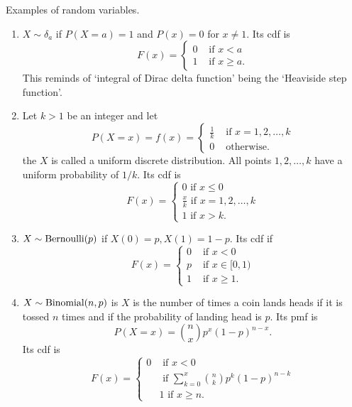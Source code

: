 \documentclass{article}
\begin{document}
Examples of random variables.
\begin{enumerate}
\item $X \sim \delta_a$ if $P(X=a) = 1$ and $P(x) = 0$ for $x \ne 1$. Its cdf is
\begin{equation}\label{c2e1}
F(x) = \begin{cases}
0 & \text{ if } x < a \\
1 & \text{ if } x \ge a.
\end{cases}
\end{equation}
This  reminds of `integral of Dirac delta function' being the `Heaviside step
function'.

\item Let $k > 1$ be an integer and let 
\begin{equation}\label{c2e2}
P(X=x) = f(x) = \begin{cases}
\frac{1}{k} & \text{ if } x = 1, 2, \ldots, k \\
0 & \text{ otherwise.}
\end{cases}
\end{equation}
the $X$ is called a uniform discrete distribution. All points $1, 2, \ldots, k$
have a uniform probability of $1/k$. Its cdf is
\begin{equation}\label{c2e3}
F(x) = \begin{cases}
0 \text{ if } x \le 0 \\
\frac{x}{k} \text{ if } x = 1, 2, \ldots, k \\
1 \text{ if } x > k.
\end{cases}
\end{equation}

\item $X \sim \text{Bernoulli}(p)$ if $X(0) = p, X(1) = 1 - p$. Its cdf if
\begin{equation}\label{c2e4}
F(x) = \begin{cases}
0 & \text{ if } x < 0 \\
p & \text{ if } x \in [0, 1) \\
1 & \text{ if } x \ge 1.
\end{cases}
\end{equation}

\item $X \sim \text{Binomial}(n, p)$ is $X$ is the number of times a coin lands heads if
it is tossed $n$ times and if the probability of landing head is $p$. Its pmf
is 
\begin{equation}\label{c2e5}
P(X=x) = \binom{n}{x}p^x(1 - p)^{n-x}.
\end{equation}
Its cdf is
\begin{equation}\label{c2e6}
F(x) = \begin{cases}
0 & \text{ if } x < 0 \\
 & \text{ if } \sum_{k=0}^x\binom{n}{k}p^k(1 - p)^{n-k} \\
 & 1 \text{ if } x \ge n.
\end{cases}
\end{equation}


\end{enumerate}
\end{document}
